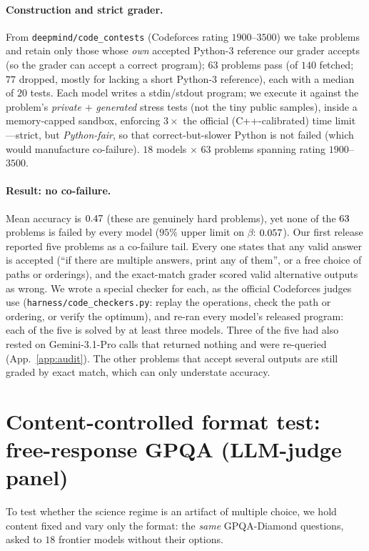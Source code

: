 \documentclass[11pt]{article}
\theoremstyle{plain}
\theoremstyle{definition}
\begin{document}
\paragraph{Construction and strict grader.} From \texttt{deepmind/code\_contests} (Codeforces rating $1900$--$3500$) we take
problems and retain only those whose \emph{own} accepted Python-3 reference our grader accepts (so the grader can accept a correct program); $63$ problems pass (of $140$ fetched; $77$ dropped, mostly for lacking a short Python-3
reference), each with a median of $20$ tests. Each model writes a stdin/stdout
program; we execute it against the problem's \emph{private} $+$ \emph{generated} stress tests (not the tiny public samples),
inside a memory-capped sandbox, enforcing $3\times$ the official (C++-calibrated) time limit---strict, but \emph{Python-fair}, so
that correct-but-slower Python is not failed (which would manufacture co-failure). $18$ models $\times$ $63$ problems
spanning rating $1900$--$3500$.

\paragraph{Result: no co-failure.} Mean accuracy is $0.47$ (these are genuinely hard problems), yet none of the
$63$ problems is failed by every model ($95\%$ upper limit on $\beta$: $0.057$). Our first release reported five
problems as a co-failure tail. Every one states that any valid answer is accepted (``if there are multiple answers, print any
of them'', or a free choice of paths or orderings), and the exact-match grader scored valid alternative outputs as wrong. We
wrote a special checker for each, as the official Codeforces judges use (\texttt{harness/code\_checkers.py}: replay the
operations, check the path or ordering, or verify the optimum), and re-ran every model's released program: each of the five
is solved by at least three models. Three of the five had also rested on Gemini-3.1-Pro calls that returned nothing and were
re-queried (App.~\ref{app:audit}). The other problems that accept several outputs are still graded by exact match, which can
only understate accuracy.

\section{Content-controlled format test: free-response GPQA (LLM-judge panel)}\label{app:opengpqa}
To test whether the science regime is an artifact of multiple choice, we hold content fixed and vary only the format: the
\emph{same} GPQA-Diamond questions, asked to $18$ frontier models without their options.
\end{document}

